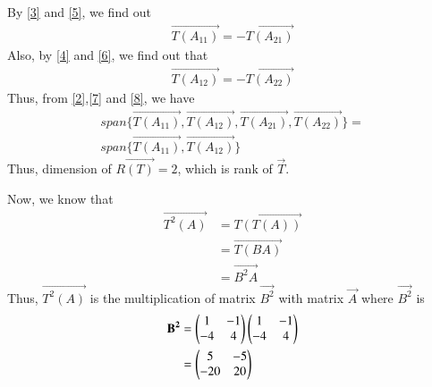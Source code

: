 \documentclass[journal,12pt,twocolumn]{IEEEtran}
\begin{document}
By \eqref{3} and \eqref{5}, we find out 
\begin{align}
\vec{T(A_{11})} = -\vec{T(A_{21})}\label{7}
\end{align}
Also, by \eqref{4} and \eqref{6}, we find out that
\begin{align}
\vec{T(A_{12})} = -\vec{T(A_{22})}\label{8}
\end{align}
Thus, from \eqref{2},\eqref{7} and \eqref{8}, we have
\begin{multline}
span\{\vec{T(A_{11})}, \vec{T(A_{12})},\vec{T(A_{21})},\vec{T(A_{22})}\} = \\
span\{\vec{T(A_{11})}, \vec{T(A_{12})}\}	
\end{multline}
Thus, dimension of $R\vec{(T)} =2$, which is rank of $\vec{T}$. 

Now, we know that
\begin{align}
\vec{T^2(A)} & = \vec{T(T(A))} \\
             & = \vec{T(BA)} \\
             & = \vec{B^2A}
\end{align}
Thus, $\vec{T^2(A)}$ is the multiplication of matrix $\vec{B^2}$ with matrix $\vec{A}$ where $\vec{B^2}$ is
\begin{align}
\mathbf{B^2} & = \begin{pmatrix}1 & -1 \\ -4 & 4\end{pmatrix}\begin{pmatrix}1 & -1 \\ -4 & 4\end{pmatrix} \\
          & = \begin{pmatrix}5 & -5 \\ -20 & 20\end{pmatrix}
\end{align}
\end{document}
